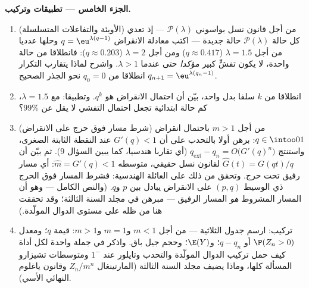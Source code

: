 \begin{problem}
\medskip
\noindent\textbf{الجزء الخامس --- تطبيقات وتركيب.}
\begin{enumerate}[resume]
  \item (الأوبئة والتفاعلات المتسلسلة) من أجل قانون نسل بواسوني
        $\mathcal P(\lambda)$ --- إذ تعدي كل حالة $\mathcal P(\lambda)$ حالة جديدة --- اكتب
        معادلة الانقراض $q = \eu^{\lambda(q-1)}$ وحلها عدديا من أجل $\lambda = 1.5$ ($q \approx
        0.417$)
        ومن أجل $\lambda = 2$ ($q \approx 0.203$): فانطلاقا من حالة واحدة، لا يكون
        تفشٍّ كبير \emph{مؤكدا} حتى عندما $\lambda > 1$. واشرح لماذا
        يتقارب التكرار $q_{n+1} = \eu^{\lambda(q_n - 1)}$ انطلاقا من $q_0 = 0$ نحو الجذر الصحيح.
  \item انطلاقا من $k$ سلفا بدل واحد، بيّن أن احتمال الانقراض هو
        $q^k$. وتطبيقا: مع $\lambda = 1.5$، كم حالة ابتدائية تجعل احتمال
        التفشي لا يقل عن $99\%$؟
  \item (شرط مسار فوق حرج على الانقراض) من أجل $m > 1$ باحتمال
        انقراض $q \in
        \intoo01$: برهن أولا بالتحدب على أن $G'(q) < 1$ عند النقطة
        الثابتة الصغرى، واستنتج
        $q_{\mathrm{ext}} - q_n = O\bigl(G'(q)^n\bigr)$
        (أي تقاربا هندسيا، كما يبين السؤال 9). ثم بيّن أن $\widehat G(t) = G(qt)/q$
         لقانون نسل حقيقي، متوسطه $\widehat m =
        G'(q) < 1$: أي مسار رفيق
        تحت حرج. وتحقق من ذلك على العائلة الهندسية: فشرط المسار فوق
        الحرج ذي الوسيط $(p, q)$ على الانقراض يبادل بين $p$
        و$q$. (والنص الكامل --- وهو أن المسار المشروط \emph{هو}
        المسار الرفيق --- مبرهن في مجلد السنة الثالثة؛ وقد تحققت
        هنا من ظله على مستوى الدوال المولّدة.)
  \item تركيب: ارسم جدول الثلاثية --- من أجل $m <
        1$ و$m = 1$
        و$m > 1$: قيمة $q$؛ ومعدل $\P(Z_n >
        0)$ أو $q - q_n$؛ و$\E(Y)$؛
        وحجم جيل باق. واذكر في جملة واحدة لكل أداة كيف حمل تركيب
        الدوال المولّدة والتحدب وتايلور عند $1^-$ ومتوسطات تشيزارو
        المسألة كلها، وماذا يضيف مجلد السنة الثالثة (المارتينغال
        $Z_n/m^n$ وقانون ياغلوم النهائي الأسي).
\end{enumerate}
\end{problem}
